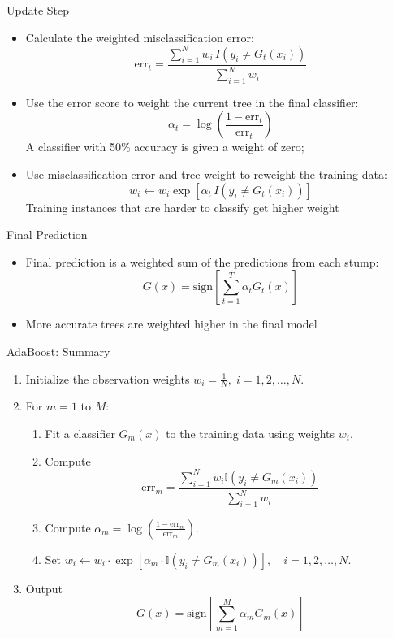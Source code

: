 \begin{frame}{Update Step}
\begin{itemize}
    \item Calculate the weighted misclassification error:
    \[
    \text{err}_t = \frac{\sum_{i=1}^{N} w_i \, I(y_i \neq G_t(x_i))}{\sum_{i=1}^{N} w_i}
    \]

    \item Use the error score to weight the current tree in the final classifier:
    \[
    \alpha_t = \log\left(\frac{1 - \text{err}_t}{\text{err}_t}\right)
    \]
    A classifier with 50\% accuracy is given a weight of zero;

    \item Use misclassification error and tree weight to reweight the training data:
    \[
    w_i \leftarrow w_i \exp\left[\alpha_t \, I(y_i \neq G_t(x_i))\right]
    \]
    Training instances that are harder to classify get higher weight
\end{itemize}
\end{frame}


\begin{frame}{Final Prediction}
\begin{itemize}
    \item Final prediction is a weighted sum of the predictions from each stump:
    \[
    G(x) = \text{sign} \left[ \sum_{t=1}^{T} \alpha_t G_t(x) \right]
    \]
    
    \item More accurate trees are weighted higher in the final model
\end{itemize}
\end{frame}


\begin{frame}{AdaBoost: Summary}
\begin{enumerate}
    \item Initialize the observation weights \( w_i = \frac{1}{N},\; i = 1, 2, \ldots, N \).
    
    \item For \( m = 1 \) to \( M \):
    \begin{enumerate}
        \item Fit a classifier \( G_m(x) \) to the training data using weights \( w_i \).
        
        \item Compute
        \[
        \text{err}_m = \frac{\sum_{i=1}^{N} w_i \mathbb{I}(y_i \ne G_m(x_i))}{\sum_{i=1}^{N} w_i}
        \]
        
        \item Compute \( \alpha_m = \log \left( \frac{1 - \text{err}_m}{\text{err}_m} \right) \).
        
        \item Set \( w_i \leftarrow w_i \cdot \exp \left[ \alpha_m \cdot \mathbb{I}(y_i \ne G_m(x_i)) \right],\quad i = 1, 2, \ldots, N \).
    \end{enumerate}

    \item Output 
    \[
    G(x) = \text{sign} \left[ \sum_{m=1}^{M} \alpha_m G_m(x) \right]
    \]
\end{enumerate}
\end{frame}


